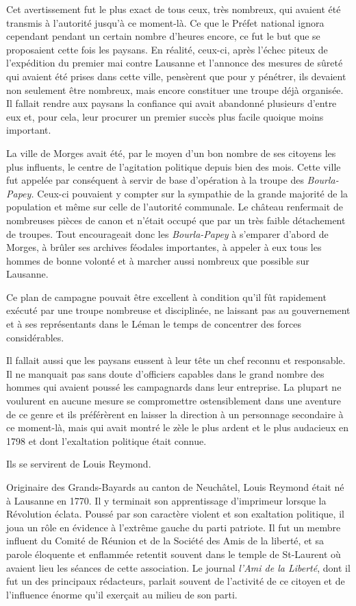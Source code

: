 \documentclass[french,twoside]{book} %
\begin{document}
\noindent Cet avertissement fut le plus exact de tous ceux, très nombreux, qui avaient été transmis à l’autorité jusqu’à ce moment-là. Ce que le Préfet national ignora cependant pendant un certain nombre d’heures encore, ce fut le but que se proposaient cette fois les paysans. En réalité, ceux-ci, après l’échec piteux de l’expédition du premier mai contre Lausanne et l’annonce des mesures de sûreté qui avaient été prises dans cette ville, pensèrent que pour y pénétrer, ils devaient non seulement être nombreux, mais encore constituer une troupe déjà organisée. Il fallait rendre aux paysans la confiance qui avait abandonné plusieurs d’entre eux et, pour cela, leur procurer un premier succès plus facile quoique moins important.\par
La ville de Morges avait été, par le moyen d’un bon nombre de ses citoyens les plus influents, le centre de l’agitation politique depuis bien des mois. Cette ville fut appelée par conséquent à servir de base d’opération à la troupe des \emph{Bourla-Papey.} Ceux-ci pouvaient y compter sur la sympathie de la grande majorité de la population et même sur celle de l’autorité communale. Le château renfermait de nombreuses pièces de canon et n’était occupé que par un très faible détachement de troupes. Tout encourageait donc les \emph{Bourla-Papey} à s’emparer d’abord de Morges, à brûler ses archives féodales importantes, à appeler à eux tous les hommes de bonne volonté et à marcher aussi nombreux que possible sur Lausanne.\par
Ce plan de campagne pouvait être excellent à condition qu’il fût rapidement exécuté par une troupe nombreuse et disciplinée, ne laissant pas au gouvernement et à ses représentants dans le Léman le temps de concentrer des forces considérables.\par
Il fallait aussi que les paysans eussent à leur tête un chef reconnu et responsable. Il ne manquait pas sans doute d’officiers capables dans le grand nombre des hommes qui avaient poussé les campagnards dans leur entreprise. La plupart ne voulurent en aucune mesure se compromettre ostensiblement dans une aventure de ce genre et ils préférèrent en laisser la direction à un personnage secondaire à ce moment-là, mais qui avait montré le zèle le plus ardent et le plus audacieux en 1798 et dont l’exaltation politique était connue.\par
Ils se servirent de Louis Reymond.\par
Originaire des Grands-Bayards au canton de Neuchâtel, Louis Reymond était né à Lausanne en 1770. Il y terminait son apprentissage d’imprimeur lorsque la Révolution éclata. Poussé par son caractère violent et son exaltation politique, il joua un rôle en évidence à l’extrême gauche du parti patriote. Il fut un membre influent du Comité de Réunion et de la Société des Amis de la liberté, et sa parole éloquente et enflammée retentit souvent dans le temple de St-Laurent où avaient lieu les séances de cette association. Le journal \emph{l’Ami de la Liberté}, dont il fut un des principaux rédacteurs, parlait souvent de l’activité de ce citoyen et de l’influence énorme qu’il exerçait au milieu de son parti.\par
\end{document}
